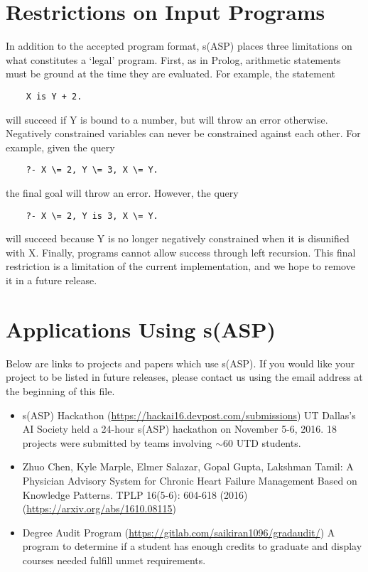 \documentclass[]{article}
\begin{document}
\section{Restrictions on Input Programs}

In addition to the accepted program format, s(ASP) places three limitations on
what constitutes a `legal' program. First, as in Prolog, arithmetic statements
must be ground at the time they are evaluated. For example, the statement
\begin{verbatim}
    X is Y + 2.
\end{verbatim}
will succeed if Y is bound to a number, but will throw an error otherwise.
Negatively constrained variables can never be constrained against each other.
For example, given the query
\begin{verbatim}
    ?- X \= 2, Y \= 3, X \= Y.
\end{verbatim}
the final goal will throw an error. However, the query
\begin{verbatim}
    ?- X \= 2, Y is 3, X \= Y.
\end{verbatim}
will succeed because Y is no longer negatively constrained when it is disunified
with X. Finally, programs cannot allow success through left recursion. This
final restriction is a limitation of the current implementation, and we hope to
remove it in a future release.


\section{Applications Using s(ASP)}

Below are links to projects and papers which use s(ASP). If you would like your
project to be listed in future releases, please contact us using the email
address at the beginning of this file.

\begin{itemize}
\item s(ASP) Hackathon (\url{https://hackai16.devpost.com/submissions}) UT
Dallas's AI Society held a 24-hour s(ASP) hackathon on November 5-6, 2016. 18
projects were submitted by teams involving $\sim$60 UTD students.
\item  Zhuo Chen, Kyle Marple, Elmer Salazar, Gopal Gupta, Lakshman Tamil: A 
Physician Advisory System for Chronic Heart Failure Management Based on 
Knowledge Patterns. TPLP 16(5-6): 604-618 (2016) 
(\url{https://arxiv.org/abs/1610.08115})
\item Degree Audit Program (\url{https://gitlab.com/saikiran1096/gradaudit/}) 
A program to determine if a student has enough credits to graduate and display 
courses needed fulfill unmet requirements.
\end{itemize}
\end{document}
